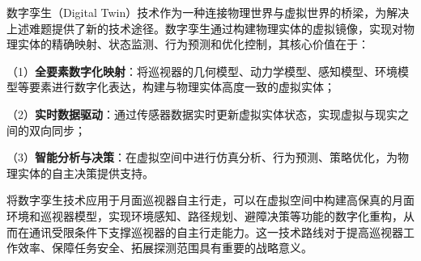 数字孪生（Digital Twin）技术作为一种连接物理世界与虚拟世界的桥梁，为解决上述难题提供了新的技术途径\cite{ref5}。数字孪生通过构建物理实体的虚拟镜像，实现对物理实体的精确映射、状态监测、行为预测和优化控制，其核心价值在于：

（1）\textbf{全要素数字化映射}：将巡视器的几何模型、动力学模型、感知模型、环境模型等要素进行数字化表达，构建与物理实体高度一致的虚拟实体；

（2）\textbf{实时数据驱动}：通过传感器数据实时更新虚拟实体状态，实现虚拟与现实之间的双向同步；

（3）\textbf{智能分析与决策}：在虚拟空间中进行仿真分析、行为预测、策略优化，为物理实体的自主决策提供支持。

将数字孪生技术应用于月面巡视器自主行走，可以在虚拟空间中构建高保真的月面环境和巡视器模型，实现环境感知、路径规划、避障决策等功能的数字化重构，从而在通讯受限条件下支撑巡视器的自主行走能力\cite{ref6}。这一技术路线对于提高巡视器工作效率、保障任务安全、拓展探测范围具有重要的战略意义。
